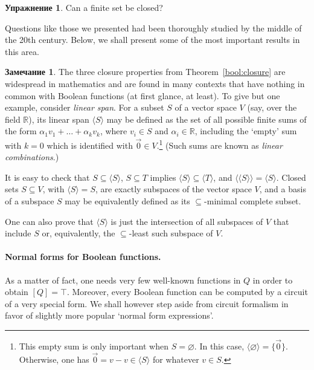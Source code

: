 \documentclass[12pt,notitlepage]{article}
\theoremstyle{plain}
\theoremstyle{definition}
\newtheorem{exc}[thm]{Упражнение}
\newtheorem{rem}[thm]{Замечание}
\theoremstyle{plain}
\newcommand{\R}{\mathbb{R}}
\newcommand{\sbs}{\subseteq}
\newcommand{\void}{\varnothing}
\newcommand{\1}{\mathbf{1}}
\newcommand{\0}{\mathbf{0}}
\newcommand{\mcomm}[1]{}
\begin{document}
\begin{exc}
	Can a finite set be closed?
\end{exc}

Questions like those we presented had been thoroughly studied by the middle of the 20th century. Below, we shall present some of the most important results in this area.

\begin{rem}
	The three closure properties from Theorem~\ref{bool:closure} are widespread in mathematics and are found in many contexts that have nothing in common with Boolean functions (at first glance, at least). To give but one example, consider \emph{linear span}. For a subset $S$ of a vector space $V$ (say, over the field $\R$), its linear span $\langle S \rangle$ may be defined as the set of all possible finite sums of the form $\alpha_1 v_1 + \ldots + \alpha_k v_k$, where $v_i \in S$ and $\alpha_i \in \R$, including the `empty' sum with $k = 0$ which is identified with $\vec 0 \in V$.\footnote{This empty sum is only important when $S = \void$. In this case, $\langle \void \rangle = \{\vec 0\}$. Otherwise, one has $\vec 0 = v - v \in \langle S \rangle$ for whatever $v \in S$.} (Such sums are known as \emph{linear combinations}.)
	
	It is easy to check that $S \sbs \langle S \rangle$, $S \sbs T$ implies $\langle S \rangle \sbs \langle T \rangle$, and $\langle \langle S \rangle \rangle = \langle S \rangle$. Closed sets $S \sbs V$, with $\langle S \rangle = S$, are exactly subspaces of the vector space $V$, and a basis of a subspace $S$ may be equivalently defined as its ${\sbs}$-minimal complete subset.
	
	One can also prove that $\langle S \rangle$ is just the intersection of all subspaces of $V$ that include $S$ or, equivalently, the ${\sbs}$-least such subspace of $V$.
\end{rem}

\mcomm{The Instructor might wish to give more examples of this kind like topological or deductive closures.}

\paragraph{Normal forms for Boolean functions.} As a matter of fact, one needs very few well-known functions in $Q$ in order to obtain $[Q] = \top$. Moreover, every Boolean function can be computed by a circuit of a very special form. We shall however step aside from circuit formalism in favor of slightly more popular `normal form expressions'.
\end{document}
